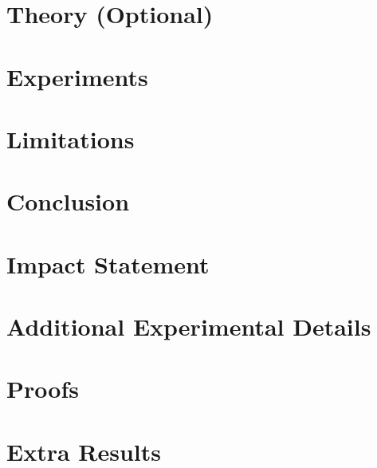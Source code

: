 \documentclass{article}
\theoremstyle{plain}
\theoremstyle{definition}
\theoremstyle{remark}
\begin{document}
\section{Theory (Optional)}

\section{Experiments}

\section{Limitations}

\section{Conclusion}

\section*{Impact Statement}





\appendix

\section{Additional Experimental Details}

\section{Proofs}

\section{Extra Results}
\end{document}
